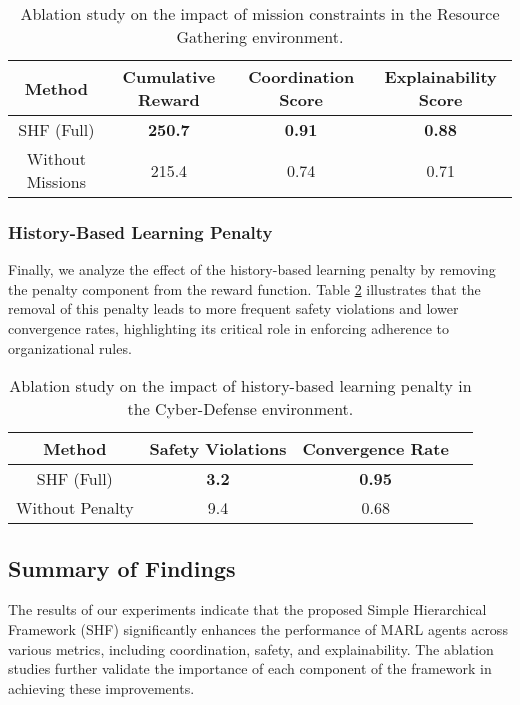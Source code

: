 \documentclass[sigconf,anonymous]{aamas}
\begin{document}
\begin{table}[ht]
\centering
\caption{Ablation study on the impact of mission constraints in the Resource Gathering environment.}
\label{table:mission_ablation}
\begin{tabular}{|c|c|c|c|}
\hline
\textbf{Method} & \textbf{Cumulative Reward} & \textbf{Coordination Score} & \textbf{Explainability Score} \\ \hline
SHF (Full) & \textbf{250.7} & \textbf{0.91} & \textbf{0.88} \\ \hline
Without Missions & 215.4 & 0.74 & 0.71 \\ \hline
\end{tabular}
\end{table}

\subsubsection{History-Based Learning Penalty}
Finally, we analyze the effect of the history-based learning penalty by removing the penalty component from the reward function. Table \ref{table:history_penalty_ablation} illustrates that the removal of this penalty leads to more frequent safety violations and lower convergence rates, highlighting its critical role in enforcing adherence to organizational rules.

\begin{table}[ht]
\centering
\caption{Ablation study on the impact of history-based learning penalty in the Cyber-Defense environment.}
\label{table:history_penalty_ablation}
\begin{tabular}{|c|c|c|c|}
\hline
\textbf{Method} & \textbf{Safety Violations} & \textbf{Convergence Rate} \\ \hline
SHF (Full) & \textbf{3.2} & \textbf{0.95} \\ \hline
Without Penalty & 9.4 & 0.68 \\ \hline
\end{tabular}
\end{table}

\subsection{Summary of Findings}
The results of our experiments indicate that the proposed Simple Hierarchical Framework (SHF) significantly enhances the performance of MARL agents across various metrics, including coordination, safety, and explainability. The ablation studies further validate the importance of each component of the framework in achieving these improvements.
\end{document}
